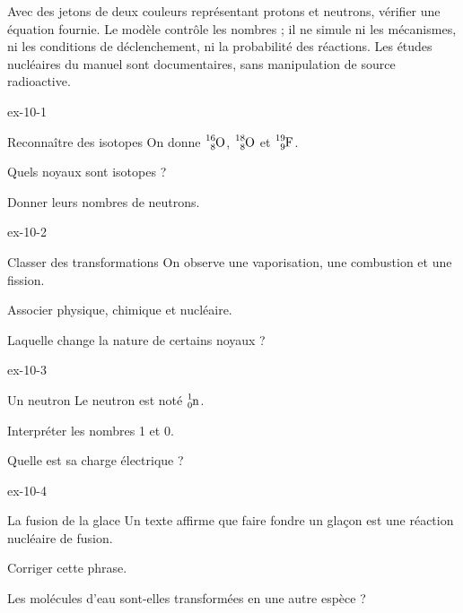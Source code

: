 \begin{experience}Avec des jetons de deux couleurs représentant protons et neutrons, vérifier une équation fournie. Le modèle contrôle les nombres ; il ne simule ni les mécanismes, ni les conditions de déclenchement, ni la probabilité des réactions. Les études nucléaires du manuel sont documentaires, sans manipulation de source radioactive.\end{experience}
\exercices
{}
\begin{blocLivre}{ex-10-1}\begin{exercice}[1]{Reconnaître des isotopes}
On donne $\ce{^{16}_{8}O}$, $\ce{^{18}_{8}O}$ et $\ce{^{19}_{9}F}$.
\begin{questions}
\item Quels noyaux sont isotopes ?
\item Donner leurs nombres de neutrons.
\end{questions}
\end{exercice}\end{blocLivre}
\begin{blocLivre}{ex-10-2}\begin{exercice}[1]{Classer des transformations}
On observe une vaporisation, une combustion et une fission.
\begin{questions}
\item Associer physique, chimique et nucléaire.
\item Laquelle change la nature de certains noyaux ?
\end{questions}
\end{exercice}\end{blocLivre}
\begin{blocLivre}{ex-10-3}\begin{exercice}[1]{Un neutron}
Le neutron est noté $\ce{^{1}_{0}n}$.
\begin{questions}
\item Interpréter les nombres 1 et 0.
\item Quelle est sa charge électrique ?
\end{questions}
\end{exercice}\end{blocLivre}
\begin{blocLivre}{ex-10-4}\begin{exercice}[1]{La fusion de la glace}
Un texte affirme que faire fondre un glaçon est une réaction nucléaire de fusion.
\begin{questions}
\item Corriger cette phrase.
\item Les molécules d’eau sont-elles transformées en une autre espèce ?
\end{questions}
\end{exercice}\end{blocLivre}
